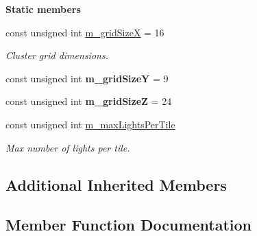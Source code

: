 \begin{Indent}\textbf{ Static members}\par
\begin{DoxyCompactItemize}
\item 
\mbox{\label{classrev_1_1_light_cluster_grid_abe87904907755b380009cbcf19c52d84}} 
const unsigned int \mbox{\hyperlink{classrev_1_1_light_cluster_grid_abe87904907755b380009cbcf19c52d84}{m\+\_\+grid\+SizeX}} = 16
\begin{DoxyCompactList}\small\item\em Cluster grid dimensions. \end{DoxyCompactList}\item 
\mbox{\label{classrev_1_1_light_cluster_grid_abf98d7fa69078fc7e71d0366fe3358f4}} 
const unsigned int {\bfseries m\+\_\+grid\+SizeY} = 9
\item 
\mbox{\label{classrev_1_1_light_cluster_grid_aed4eb2989d5a5368f5e04a7099d8a5b9}} 
const unsigned int {\bfseries m\+\_\+grid\+SizeZ} = 24
\item 
\mbox{\label{classrev_1_1_light_cluster_grid_ad7c22f68ac71178f38f20d4339dcd02d}} 
const unsigned int \mbox{\hyperlink{classrev_1_1_light_cluster_grid_ad7c22f68ac71178f38f20d4339dcd02d}{m\+\_\+max\+Lights\+Per\+Tile}}
\begin{DoxyCompactList}\small\item\em Max number of lights per tile. \end{DoxyCompactList}\end{DoxyCompactItemize}
\end{Indent}
\subsection*{Additional Inherited Members}


\subsection{Member Function Documentation}
\mbox{\label{classrev_1_1_light_cluster_grid_ae6997baead0a18e803d84251788bd5cf}} 

